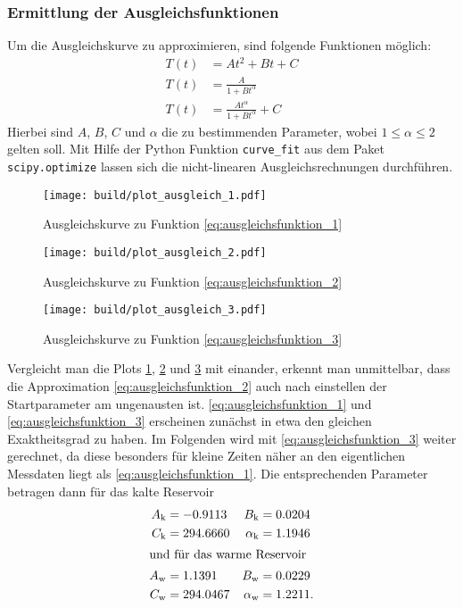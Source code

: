 \subsubsection[]{Ermittlung der Ausgleichsfunktionen}
Um die Ausgleichskurve zu approximieren, sind folgende Funktionen möglich:
\begin{align}
    T \left(t\right) &= A t^2 + B t + C \label{eq:ausgleichsfunktion_1} \\
    T \left(t\right) &= \frac{A}{1 + B t^{\alpha}} \label{eq:ausgleichsfunktion_2} \\
    T \left(t\right) &= \frac{A t^{\alpha}}{1 + B t^{\alpha}} + C \label{eq:ausgleichsfunktion_3}
\end{align}
Hierbei sind $A$, $B$, $C$ und $\alpha$ die zu bestimmenden Parameter, wobei $1 \leq \alpha \leq 2$ gelten soll.
Mit Hilfe der Python \cite[]{python} Funktion \texttt{curve\_fit} aus dem Paket \texttt{scipy.optimize} 
\cite[]{scipy} lassen sich die nicht-linearen Ausgleichsrechnungen durchführen.
\begin{figure}
    \texttt{[image: build/plot\_ausgleich\_1.pdf]}
    \caption[]{Ausgleichskurve zu Funktion \eqref{eq:ausgleichsfunktion_1}}
    \label{fig:ausgleichsplot_1}
\end{figure}
\begin{figure}
    \texttt{[image: build/plot\_ausgleich\_2.pdf]}
    \caption[]{Ausgleichskurve zu Funktion \eqref{eq:ausgleichsfunktion_2}}
    \label{fig:ausgleichsplot_2}
\end{figure}
\begin{figure}
    \texttt{[image: build/plot\_ausgleich\_3.pdf]}
    \caption[]{Ausgleichskurve zu Funktion \eqref{eq:ausgleichsfunktion_3}}
    \label{fig:ausgleichsplot_3}
\end{figure}
Vergleicht man die Plots \ref{fig:ausgleichsplot_1}, \ref{fig:ausgleichsplot_2} und \ref{fig:ausgleichsplot_3} mit einander,
erkennt man unmittelbar, dass die Approximation \eqref{eq:ausgleichsfunktion_2} auch nach einstellen der Startparameter am ungenausten ist.
\eqref{eq:ausgleichsfunktion_1} und \eqref{eq:ausgleichsfunktion_3} erscheinen zunächst in etwa den gleichen Exaktheitsgrad zu haben.
Im Folgenden wird mit \eqref{eq:ausgleichsfunktion_3} weiter gerechnet, da diese besonders für kleine Zeiten näher an den eigentlichen Messdaten liegt
als \eqref{eq:ausgleichsfunktion_1}.
Die entsprechenden Parameter betragen dann für das kalte Reservoir
\begin{align*}
    A_{\text{k}} &= -0.9113 & B_{\text{k}} &= 0.0204 \\
    C_{\text{k}} &= 294.6660 & \alpha_{\text{k}} &= 1.1946 \\
    \intertext{und für das warme Reservoir}
    A_{\text{w}} &= 1.1391 & B_{\text{w}} &= 0.0229 \\
    C_{\text{w}} &= 294.0467 & \alpha_{\text{w}} &= 1.2211.
\end{align*}


